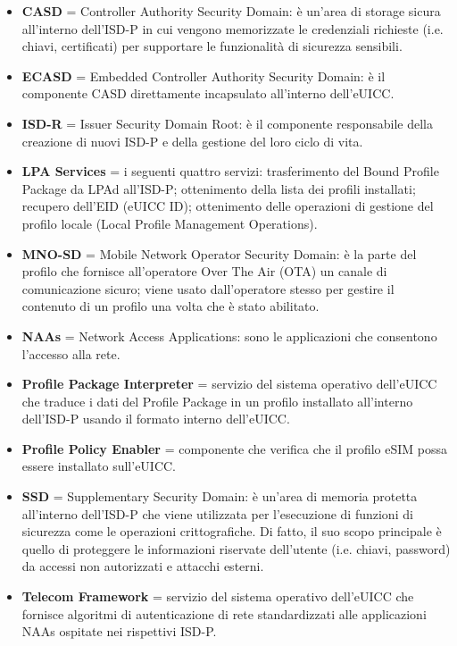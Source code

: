 \documentclass[10pt, oneside]{book}
\begin{document}
\begin{itemize}
\item \textbf{CASD} = Controller Authority Security Domain: è un'area di storage sicura all'interno dell'ISD-P in cui vengono memorizzate le credenziali richieste (i.e. chiavi, certificati) per supportare le funzionalità di sicurezza sensibili.
\item \textbf{ECASD} = Embedded Controller Authority Security Domain: è il componente CASD direttamente incapsulato all'interno dell'eUICC.
\item \textbf{ISD-R} = Issuer Security Domain Root: è il componente responsabile della creazione di nuovi ISD-P e della gestione del loro ciclo di vita.
\item \textbf{LPA Services} = i seguenti quattro servizi: trasferimento del Bound Profile Package da LPAd all'ISD-P; ottenimento della lista dei profili installati; recupero dell'EID (eUICC ID); ottenimento delle operazioni di gestione del profilo locale (Local Profile Management Operations).
\item \textbf{MNO-SD} = Mobile Network Operator Security Domain: è la parte del profilo che fornisce all'operatore Over The Air (OTA) un canale di comunicazione sicuro; viene usato dall'operatore stesso per gestire il contenuto di un profilo una volta che è stato abilitato.
\item \textbf{NAAs} = Network Access Applications: sono le applicazioni che consentono l'accesso alla rete.
\item \textbf{Profile Package Interpreter} = servizio del sistema operativo dell'eUICC che traduce i dati del Profile Package in un profilo installato all'interno dell'ISD-P usando il formato interno dell'eUICC.
\item \textbf{Profile Policy Enabler} = componente che verifica che il profilo eSIM possa essere installato sull’eUICC.
\item \textbf{SSD} = Supplementary Security Domain: è un'area di memoria protetta all'interno dell'ISD-P che viene utilizzata per l'esecuzione di funzioni di sicurezza come le operazioni crittografiche. Di fatto, il suo scopo principale è quello di proteggere le informazioni riservate dell'utente (i.e. chiavi, password) da accessi non autorizzati e attacchi esterni.
\item \textbf{Telecom Framework} = servizio del sistema operativo dell'eUICC che fornisce algoritmi di autenticazione di rete standardizzati alle applicazioni NAAs ospitate nei rispettivi ISD-P.
\end{itemize}
\end{document}
